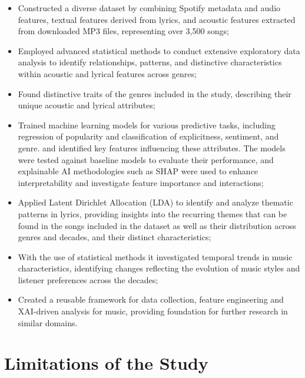 \begin{itemize}
  \item Constructed a diverse dataset by combining Spotify metadata and audio
    features, textual features derived from lyrics, and acoustic features
    extracted from downloaded MP3 files, representing over 3,500 songs;

  \item Employed advanced statistical methods to conduct extensive exploratory
    data analysis to identify relationships, patterns, and distinctive
    characteristics within acoustic and lyrical features across genres;

  \item Found distinctive traits of the genres included in the study,
    describing their unique acoustic and lyrical attributes;

  \item Trained machine learning models for various predictive tasks, including
    regression of popularity and  classification of explicitness, sentiment,
    and genre. and identified key features influencing these attributes. The
    models were tested against baseline models to evaluate their performance,
    and explainable AI methodologies such as SHAP were used to enhance
    interpretability and investigate feature importance and interactions;

  \item Applied Latent Dirichlet Allocation (LDA) to identify and analyze
    thematic patterns in lyrics, providing insights into the recurring themes
    that can be found in the songs included in the dataset as well as their
    distribution across genres and decades, and their distinct characteristics;

  \item With the use of statistical methods it investigated temporal trends in
    music characteristics, identifying changes reflecting the evolution of
    music styles and listener preferences across the decades;

  \item Created a reusable framework for data collection, feature engineering
    and XAI-driven analysis for music, providing foundation for further
    research in similar domains.
\end{itemize}






\section{Limitations of the Study}
\label{sec:limitations}

